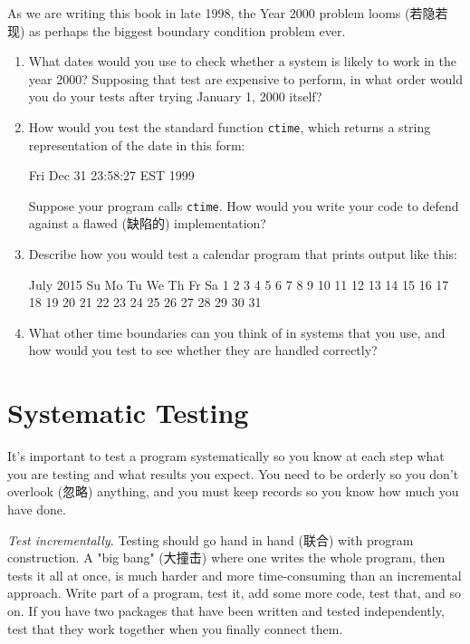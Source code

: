 \begin{exercise}
    As we are writing this book in late 1998, the Year 2000 problem looms
    (若隐若现) as perhaps the biggest boundary condition problem ever.
    \begin{enumerate}
        \item What dates would you use to check whether a system is likely
            to work in the year 2000? Supposing that test are expensive to
            perform, in what order would you do your tests after trying
            January 1, 2000 itself?
        \item How would you test the standard function \verb'ctime', which
            returns a string representation of the date in this form:
        \begin{wellcode}
            Fri Dec 31 23:58:27 EST 1999\n\0
        \end{wellcode}
        Suppose your program calls \verb'ctime'. How would you write your
        code to defend against a flawed (缺陷的) implementation?
        \item Describe how you would test a calendar program that prints
            output like this:
        \begin{wellcode}
             July 2015        
        Su Mo Tu We Th Fr Sa  
                 1  2  3  4  
        5  6  7  8  9  10 11  
        12 13 14 15 16 17 18  
        19 20 21 22 23 24 25  
        26 27 28 29 30 31     
        \end{wellcode}
        \item What other time boundaries can you think of in systems that
            you use, and how would you test to see whether they are handled
            correctly?
    \end{enumerate}
\end{exercise}

\section{Systematic Testing}
\label{sec:systematic_testing}

It's important to test a program systematically so you know at each step
what you are testing and what results you expect. You need to be orderly so
you don't overlook (忽略) anything, and you must keep records so you know
how much you have done.

\emph{Test incrementally.} Testing should go hand in hand (联合) with
program construction. A "big bang" (大撞击) where one writes the whole
program, then tests it all at once, is much harder and more time-consuming
than an incremental approach. Write part of a program, test it, add some
more code, test that, and so on. If you have two packages that have been
written and tested independently, test that they work together when you
finally connect them.

